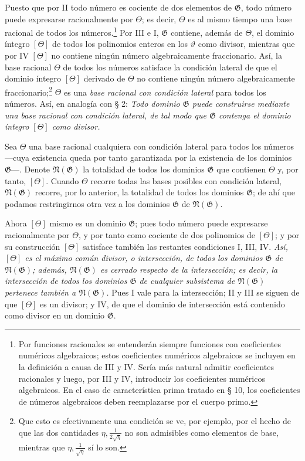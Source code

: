 Puesto que por II todo número es cociente de dos elementos de $\mathfrak G$, todo número puede expresarse racionalmente por $\Theta$; es decir, $\Theta$ es al mismo tiempo una base racional de todos los números.\footnote{Por funciones racionales se entenderán siempre funciones con coeficientes numéricos algebraicos; estos coeficientes numéricos algebraicos se incluyen en la definición a causa de III y IV. Sería más natural admitir coeficientes racionales y luego, por III y IV, introducir los coeficientes numéricos algebraicos. En el caso de característica prima tratado en § 10, los coeficientes de números algebraicos deben reemplazarse por el cuerpo primo.} Por III e I, $\mathfrak G$ contiene, además de $\Theta$, el dominio íntegro $[\Theta]$ de todos los polinomios enteros en los $\vartheta$ como divisor, mientras que por IV $[\Theta]$ no contiene ningún número algebraicamente fraccionario. Así, la base racional $\Theta$ de todos los números satisface la condición lateral de que el dominio íntegro $[\Theta]$ derivado de $\Theta$ no contiene ningún número algebraicamente fraccionario;\footnote{Que esto es efectivamente una condición se ve, por ejemplo, por el hecho de que las dos cantidades $\eta,\frac1{2\sqrt{\eta}}$ no son admisibles como elementos de base, mientras que $\eta,\frac1{\sqrt{\eta}}$ sí lo son.} $\Theta$ es una \emph{base racional con condición lateral} para todos los números. Así, en analogía con § 2: \emph{Todo dominio $\mathfrak G$ puede construirse mediante una base racional con condición lateral, de tal modo que $\mathfrak G$ contenga el dominio íntegro $[\Theta]$ como divisor.}

Sea $\Theta$ una base racional cualquiera con condición lateral para todos los números ---cuya existencia queda por tanto garantizada por la existencia de los dominios $\mathfrak G$---. Denote $\mathfrak N(\mathfrak G)$ la totalidad de todos los dominios $\mathfrak G$ que contienen $\Theta$ y, por tanto, $[\Theta]$. Cuando $\Theta$ recorre todas las bases posibles con condición lateral, $\mathfrak N(\mathfrak G)$ recorre, por lo anterior, la totalidad de todos los dominios $\mathfrak G$; de ahí que podamos restringirnos otra vez a los dominios $\mathfrak G$ de $\mathfrak N(\mathfrak G)$.

Ahora $[\Theta]$ mismo es un dominio $\mathfrak G$; pues todo número puede expresarse racionalmente por $\Theta$, y por tanto como cociente de dos polinomios de $[\Theta]$; y por su construcción $[\Theta]$ satisface también las restantes condiciones I, III, IV. \emph{Así, $[\Theta]$ es el máximo común divisor, o intersección, de todos los dominios $\mathfrak G$ de $\mathfrak N(\mathfrak G)$; además, $\mathfrak N(\mathfrak G)$ es cerrado respecto de la intersección; es decir, la intersección de todos los dominios $\mathfrak G$ de cualquier subsistema de $\mathfrak N(\mathfrak G)$ pertenece también a $\mathfrak N(\mathfrak G)$.} Pues I vale para la intersección; II y III se siguen de que $[\Theta]$ es un divisor; y IV, de que el dominio de intersección está contenido como divisor en un dominio $\mathfrak G$.

